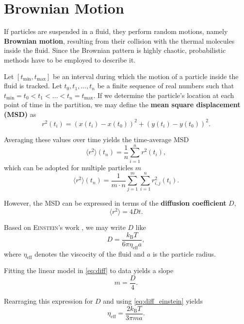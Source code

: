 \section{Brownian Motion}\label{sec:brown}
If particles are suspended in a fluid, they perform random motions, namely \textbf{Brownian motion}, resulting from their collision with the thermal molecules inside the fluid.
Since the Brownian pattern is highly chaotic, probabilistic methods have to be employed to describe it.

Let $[t_\text{min}, t_\text{max}]$ be an interval during which the motion of a particle inside the fluid is tracked.
Let $t_0, t_1,\dots,t_n$ be a finite sequence of real numbers such that $t_\text{min}=t_0<t_1<\dots<t_n=t_\text{max}$.
If we determine the particle's location at each point of time in the partition, we may define the \textbf{mean square displacement (MSD)} as
\begin{equation}\label{eq:msd}
	r^2(t_i) = (x(t_i)-x(t_0))^2 + (y(t_i)-y(t_0))^2.
\end{equation}

Averaging these values over time yields the time-average MSD
\begin{equation}\label{eq:tamsd}
	\langle r^2 \rangle(t_n) = \frac{1}{n}\sum_{i=1}^n r^2(t_i),
\end{equation}
which can be adopted for multiple particles $m$
\begin{equation}\label{eq:mptamsd}
	\langle r^2 \rangle(t_n) = \frac{1}{m\cdot n}\sum_{j=1}^m\sum_{i=1}^n r^2_{i,j}(t_i).
\end{equation}

However, the MSD can be expressed in terms of the \textbf{diffusion coefficient} $D$,
\begin{equation}\label{eq:diff}
	\langle r^2 \rangle = 4Dt.
\end{equation}

Based on \textsc{Einstein}'s work \cite{einstein}, we may write $D$ like
\begin{equation}\label{eq:diff_einstein}
	D=\frac{k_\text{B}T}{6\pi\eta_\text{eff}a},
\end{equation}
where $\eta_\text{eff}$ denotes the viscocity of the fluid and $a$ is the particle radius.

Fitting the linear model in \autoref{eq:diff} to data yields a slope
\begin{equation*}
	m = \frac{D}{4}.
\end{equation*}

Rearraging this expression for $D$ and using \autoref{eq:diff_einstein} yields
\begin{equation}\label{eq:vis}
	\eta_\text{eff} = \frac{2k_\text{B}T}{3\pi ma}.
\end{equation}

